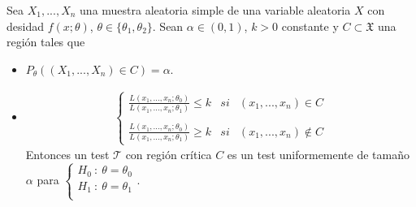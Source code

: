 \begin{lema}
Sea $X_1,...,X_n$ una muestra aleatoria simple de una variable aleatoria $X$ con desidad $f(x;\theta)$, $\theta \in \{\theta_1,\theta_2\}$. Sean $\alpha \in (0,1)$, $k >0$ constante y $C \subset \mathfrak{X}$ una región tales que
\begin{itemize}
    \item $P_{\theta}((X_1,...,X_n) \in C) = \alpha$.
    \item
    \begin{align*}
        \left\{ \begin{array}{lcc}
             \frac{L(x_1,...,x_n;\theta_0)}{L(x_1,...,x_n;\theta_1)} \leq k & si & (x_1,...,x_n) \in C \\
            \\  \frac{L(x_1,...,x_n;\theta_0)}{L(x_1,...,x_n;\theta_1)} \ge k & si & (x_1,...,x_n) \not \in C
             \end{array}
        \right.
    \end{align*}
    Entonces un test $\mathcal{T}$ con región crítica $C$ es un test uniformemente de tamaño $\alpha$ para $
    \left\{ \begin{array}{lcc}
             H_0 \ : \ \theta = \theta_0\\
             H_1 \ : \ \theta = \theta_1 \\
             \end{array}
   \right.
$.
\end{itemize}
\end{lema}